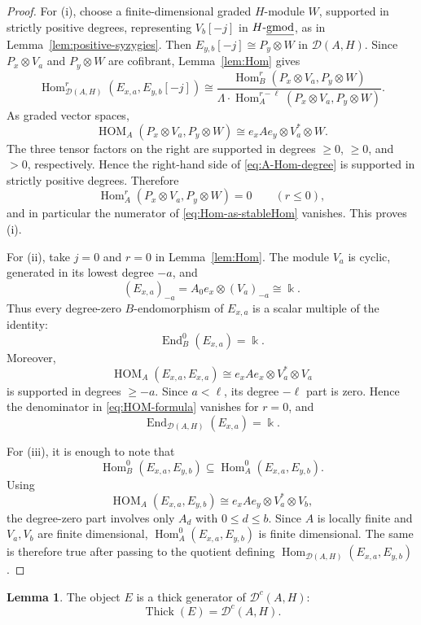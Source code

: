 \documentclass[11pt]{article}
\theoremstyle{definition}
\newtheorem{lem}[thm]{Lemma}
\numberwithin{equation}{section}
\def\udgmod{\mbox{-\underline{gmod}}}
\newcommand{\kk}{\Bbbk}
\newcommand{\Dc}{\mathcal{D}^c(A,H)}
\newcommand{\Hom}{\operatorname{Hom}}
\newcommand{\HOM}{\operatorname{HOM}}
\newcommand{\End}{\operatorname{End}}
\newcommand{\thick}{\operatorname{Thick}}
\newcommand{\Der}{\mathcal{D}}
\begin{document}
\begin{proof}
For (i), choose a finite-dimensional graded $H$-module $W$, supported in
strictly positive degrees, representing $V_b[-j]$ in $H\udgmod$, as in
Lemma~\ref{lem:positive-syzygies}.  Then
$E_{y,b}[-j]\cong P_y\otimes W$ in $\Der(A,H)$.  Since
$P_x\otimes V_a$ and $P_y\otimes W$ are cofibrant, Lemma~\ref{lem:Hom} gives
\begin{equation}\label{eq:Hom-as-stableHom}
\Hom^{r}_{\Der(A,H)}(E_{x,a},E_{y,b}[-j])
\cong
\dfrac{\Hom^r_B(P_x\otimes V_a,P_y\otimes W)}
{\Lambda\cdot
\Hom_A^{r-\ell}(P_x\otimes V_a,P_y\otimes W)} .
\end{equation}
As graded vector spaces,
\begin{equation}\label{eq:A-Hom-degree}
\HOM_A(P_x\otimes V_a,P_y\otimes W)
\cong
e_xAe_y\otimes V_a^*\otimes W.
\end{equation}
The three tensor factors on the right are supported in degrees $\ge0$, $\ge0$, and
$>0$, respectively.  Hence the right-hand side of
\eqref{eq:A-Hom-degree} is supported in strictly positive degrees.  Therefore
\[
\Hom_A^r(P_x\otimes V_a,P_y\otimes W)=0
\qquad(r\le0),
\]
and in particular the numerator of \eqref{eq:Hom-as-stableHom} vanishes.
This proves (i).

For (ii), take $j=0$ and $r=0$ in Lemma~\ref{lem:Hom}.  The module $V_a$ is
cyclic, generated in its lowest degree $-a$, and
\[
(E_{x,a})_{-a}
=
A_0e_x\otimes (V_a)_{-a}
\cong\kk.
\]
Thus every degree-zero $B$-endomorphism of $E_{x,a}$ is a scalar multiple of
the identity:
\[
\End_B^0(E_{x,a})=\kk.
\]
Moreover,
\[
\HOM_A(E_{x,a},E_{x,a})
\cong e_xAe_x\otimes V_a^*\otimes V_a
\]
is supported in degrees $\ge-a$.  Since $a<\ell$, its degree $-\ell$ part is
zero.  Hence the denominator in \eqref{eq:HOM-formula} vanishes for $r=0$,
and
\[
\End_{\Der(A,H)}(E_{x,a})=\kk.
\]

For (iii), it is enough to note that
\[
\Hom_B^0(E_{x,a},E_{y,b})
\subseteq
\Hom_A^0(E_{x,a},E_{y,b}).
\]
Using
\[
\HOM_A(E_{x,a},E_{y,b})
\cong e_xAe_y\otimes V_a^*\otimes V_b,
\]
the degree-zero part involves only $A_d$ with $0\le d\le b$.  Since $A$ is
locally finite and $V_a,V_b$ are finite dimensional,
$\Hom_A^0(E_{x,a},E_{y,b})$ is finite dimensional.  The same is therefore
true after passing to the quotient defining
$\Hom_{\Der(A,H)}(E_{x,a},E_{y,b})$.
\end{proof}

\begin{lem}\label{lem:generation-general} The object $E$ is a thick generator of $\Dc$:
\[
\thick(E)=\Dc .
\]
\end{lem}
\end{document}
